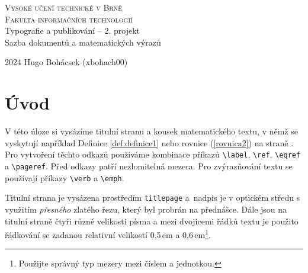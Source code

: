 \documentclass[11pt, a4paper, twocolumn]{article}
\begin{document}
\begin{titlepage}
\begin{center}
\thispagestyle{empty}
\textsc{\Huge Vysoké učení technické v Brně}\huge\\[0.5em]
\textsc{\huge Fakulta informačních technologií}\\
{\LARGE Typografie a publikování – 2. projekt}\large\\[0.6em]
{\LARGE Sazba dokumentů a matematických výrazů}\\

\end{center}
{\Large 2024 \hfill Hugo Bohácsek (xbohach00)}
\end{titlepage}
\newpage
\setcounter{page}{1}
\section*{Úvod}
V této úloze si vysázíme titulní stranu a kousek matematického textu, v němž se vyskytují například Definice \ref{def:definice1} nebo rovnice (\ref{rovnica2}) na straně \pageref{def:definice1}. Pro vytvoření
těchto odkazů používáme kombinace příkazů \verb|\label|,
\verb|\ref|, \verb|\eqref| a \verb|\pageref|. Před odkazy patří nezlomitelná mezera. Pro zvýrazňování textu se používají
příkazy \verb|\verb| a \verb|\emph|.

Titulní strana je vysázena prostředím \texttt{titlepage}
a~nadpis je v optickém středu s využitím \textit{přesného} zlatého řezu, který byl probrán na přednášce. Dále jsou
na titulní straně čtyři různé velikosti písma a mezi
dvojicemi řádků textu je použito řádkování se zadanou relativní velikostí 0,5\,em a 0,6\,em\footnote{Použijte správný typ mezery mezi číslem a jednotkou.}.
\end{document}

